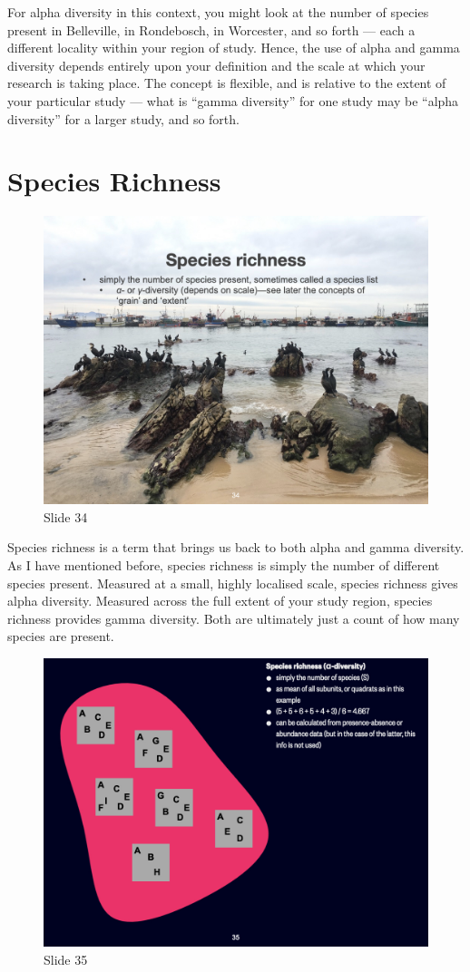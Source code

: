 \documentclass[
  12pt,
]{book}
\begin{document}
For alpha diversity in this context, you might look at the number of
species present in Belleville, in Rondebosch, in Worcester, and so forth
--- each a different locality within your region of study. Hence, the
use of alpha and gamma diversity depends entirely upon your definition
and the scale at which your research is taking place. The concept is
flexible, and is relative to the extent of your particular study ---
what is ``gamma diversity'' for one study may be ``alpha diversity'' for
a larger study, and so forth.

\section{Species Richness}\label{species-richness}

\begin{figure}[ht]
\centering
\includegraphics[width=0.8\linewidth]{../images/BDC334/BDC334-034.jpeg}
\caption*{Slide 34}
\end{figure}

Species richness is a term that brings us back to both alpha and gamma
diversity. As I have mentioned before, species richness is simply the
number of different species present. Measured at a small, highly
localised scale, species richness gives alpha diversity. Measured across
the full extent of your study region, species richness provides gamma
diversity. Both are ultimately just a count of how many species are
present.

\begin{figure}[ht]
\centering
\includegraphics[width=0.8\linewidth]{../images/BDC334/BDC334-035.jpeg}
\caption*{Slide 35}
\end{figure}
\end{document}
